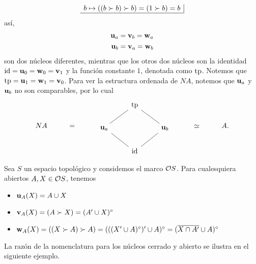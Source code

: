 \begin{exa}
\[\begin{array}{c|}
          b\mapsto ((b\succ b)\succ b) = (1\succ b) = b \\
          \hline
      \end{array}
  \]
  así,
  \begin{align*}
      \unuc a = \vnuc b = \wnuc a \\
      \unuc b = \vnuc a = \wnuc b
  \end{align*}
  son dos núcleos diferentes, mientras que
  los otros dos núcleos son la identidad $\id=\unuc 0=\wnuc
  0=\vnuc 1$ y la función constante $1$, denotada como $\tp$.
  Notemos que $\tp=\unuc 1=\wnuc 1=\vnuc 0$.
  Para ver la estructura ordenada de $NA$, notemos que
  $\unuc a$ y $\unuc b$ no son comparables, por lo cual
  \[
    NA\hspace{10mm} = \hspace{10mm}
    \begin{tikzcd}
      & \tp \\
      \unuc a \ar[ur,no head] && \unuc b \ar[ul,no head] \\
      & \id \ar[ur,no head] \ar[ul,no head]
    \end{tikzcd}
    \hspace{10mm} \simeq \hspace{10mm} A
  .\]
\end{exa}

\begin{exa}%
Sea $S$ un espacio topológico y considemos el marco $\cal O S$.
Para cualesquiera abiertos $A,X\in \cal OS$, tenemos
  \begin{itemize}
    \item $\unuc A(X)=A\cup X$
    \item $\vnuc A(X)=(A\succ X)=(A'\cup X)^\circ$
    \item
      $\wnuc A(X)
      =((X\succ A)\succ A)
      =(((X'\cup A)^\circ)'\cup A)^\circ
      =(\ol{X\cap A'}\cup A)^\circ$
  \end{itemize}
\end{exa}

La razón de la nomenclatura para los núcleos cerrado y abierto se
ilustra en el siguiente ejemplo.


